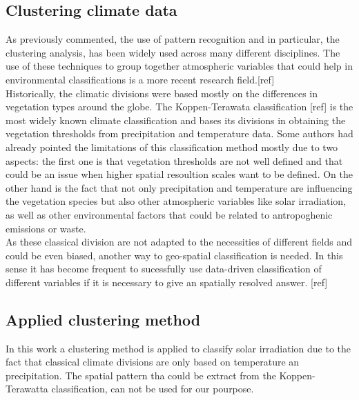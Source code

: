 

\subsection{Clustering climate data}

As previously commented, the use of pattern recognition and in particular, the clustering analysis, has been widely used across many different disciplines. The use of these techniques to group together atmospheric variables that could help in environmental classifications is a more recent research field.[ref]\\

Historically, the climatic divisions were based mostly on the differences in vegetation types around the globe. The Koppen-Terawata classification [ref] is the most widely known climate classification and bases its divisions in obtaining the vegetation thresholds from precipitation and temperature data. Some authors had already pointed the limitations of this classification method mostly due to two aspects: the first one is that vegetation thresholds are not well defined and that could be an issue when higher spatial resoultion scales want to be defined. On the other hand is the fact that not only precipitation and temperature are influencing the vegetation species but also other atmospheric variables like solar irradiation, as well as other environmental factors that could be related to antropoghenic emissions or waste.\\


As these classical division are not adapted to the necessities of different fields and could be even biased, another way to geo-spatial classification is needed. In this sense it has become frequent to sucessfully use data-driven classification of different variables if it is necessary to give an spatially resolved answer. [ref]

\subsection{Applied clustering method}

In this work a clustering method is applied to classify solar irradiation due to the fact that classical climate divisions are only based on temperature an precipitation. The spatial pattern tha could be extract from the Koppen-Terawatta classification, can not be used for our pourpose.\\

